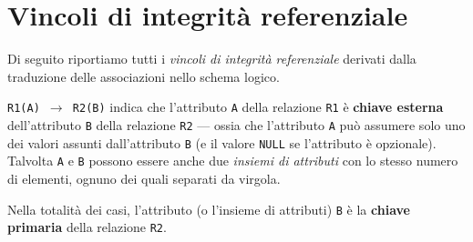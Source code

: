 \section{Vincoli di integrità referenziale}
Di seguito riportiamo tutti i {\it vincoli di integrità referenziale} derivati dalla traduzione
delle associazioni nello schema logico.

{\tt R1(A) $\rightarrow$ R2(B)} indica che l'attributo {\tt A} della relazione {\tt R1}
è {\bf chiave esterna} dell'attributo {\tt B} della relazione {\tt R2} --- ossia che l'attributo
{\tt A} può assumere solo uno dei valori assunti dall'attributo {\tt B} (e il valore
{\tt NULL} se l'attributo è opzionale). Talvolta {\tt A} e {\tt B} possono essere
anche due {\it insiemi di attributi} con lo stesso numero di elementi, ognuno dei quali
separati da virgola.

Nella totalità dei casi, l'attributo (o l'insieme di attributi) {\tt B} è la
{\bf chiave primaria} della relazione {\tt R2}.

